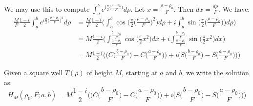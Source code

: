 \documentclass[crop=false,class=book,oneside]{standalone}
\begin{document}
            We may use this to compute $\int_{a}^{b} e^{i\frac{\pi}{2}\big(\frac{\rho-\rho_0}{F}\big)}d\rho$. Let $x=\frac{\rho-\rho_0}{F}$. Then $dx = \frac{d\rho}{F}$. We have:
            \begin{align*}
            \nonumber \frac{M}{F}\frac{1-i}{2}\int_{a}^{b}e^{i\frac{\pi}{2}\big(\frac{\rho-\rho_0}{F}\big)^2}d\rho &= \frac{M}{F}\frac{1-i}{2}\Bigg(\int_{a}^{b} \cos\bigg(\frac{\pi}{2}\big(\frac{\rho-\rho_0}{F}\big)^2\bigg)d\rho + i\int_{a}^{b} \sin\bigg(\frac{\pi}{2}\big(\frac{\rho-\rho_0}{F}\big)\bigg)d\rho\Bigg) \\
             &= M\frac{1-i}{2}\Bigg(\int_{\frac{a-\rho_0}{F}}^{\frac{b-\rho_0}{F}}\cos\bigg(\frac{\pi}{2}x^2\bigg)dx + i\int_{\frac{a-\rho_0}{F}}^{\frac{b-\rho_0}{F}}\sin\bigg(\frac{\pi}{2}x^2\bigg)dx\Bigg)\\
            \nonumber &= M\frac{1-i}{2}\Bigg(\bigg(C\big(\frac{b-\rho_0}{F}\big)-C\big(\frac{a-\rho_0}{F}\big)\bigg)+i\bigg(S\big(\frac{b-\rho_0}{F}\big)-S\big(\frac{a-\rho_0}{F}\big)\bigg)\Bigg)
            \end{align*}
            \begin{notation}
            Given a square well $T(\rho)$ of height $M$, starting at $a$ and $b$, we write the solution as:
            \begin{equation*}
            H_{M}(\rho_0,F;a,b) = M\frac{1-i}{2}\Bigg(\bigg(C\big(\frac{b-\rho_0}{F}\big)-C\big(\frac{a-\rho_0}{F}\big)\bigg)+i\bigg(S\big(\frac{b-\rho_0}{F}\big)-S\big(\frac{a-\rho_0}{F}\big)\bigg)\Bigg)
            \end{equation*}
            \end{notation}
\end{document}
